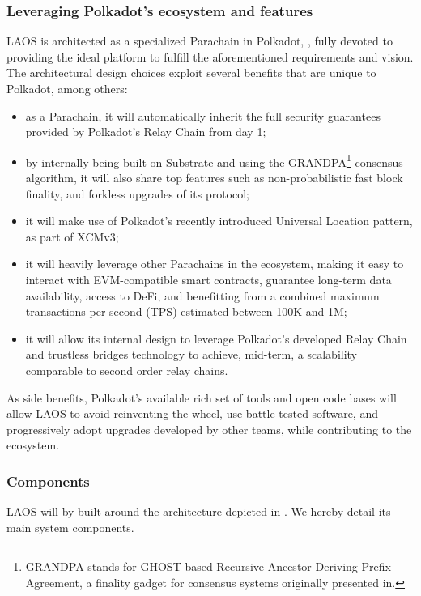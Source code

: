 \subsubsection{Leveraging Polkadot's ecosystem and features}

LAOS is architected as a specialized Parachain in Polkadot\cite{polkadot}, \cite{polkadotExplained},
fully devoted to providing the ideal platform to fulfill the aforementioned requirements and vision.
The architectural design choices exploit several benefits that are unique to Polkadot, among others:
\begin{itemize}
    \item as a Parachain, it will automatically inherit the full security guarantees 
    provided by Polkadot's Relay Chain from day 1;
    \item by internally being built on Substrate and using the GRANDPA\footnote{GRANDPA stands for GHOST-based Recursive Ancestor Deriving Prefix Agreement, a finality gadget for consensus systems originally presented in\cite{grandpa}.}
    consensus algorithm, it will also share top features such as non-probabilistic
    fast block finality, and forkless upgrades of its protocol;
    \item it will make use of Polkadot's recently introduced Universal Location pattern, as part of XCMv3;
    \item it will heavily leverage other Parachains in the ecosystem, making it easy to interact
    with EVM-compatible smart contracts, guarantee long-term data availability, access to DeFi, and
    benefitting from a combined maximum transactions per second (TPS) estimated between 100K and 1M;
    \item it will allow its internal design to leverage Polkadot's developed Relay Chain 
    and trustless bridges technology to achieve, mid-term, a scalability comparable to second order relay chains.   
\end{itemize}

As side benefits, Polkadot's available rich set of tools and open code bases will
allow LAOS to avoid reinventing the wheel, use battle-tested software,
and progressively adopt upgrades developed by other teams, while contributing to the ecosystem.

\subsubsection{Components}

LAOS will by built around the architecture depicted in .
We hereby detail its main system components.

